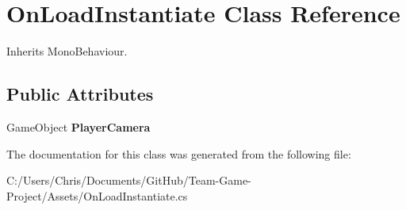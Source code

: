\hypertarget{class_on_load_instantiate}{}\section{On\+Load\+Instantiate Class Reference}
\label{class_on_load_instantiate}


Inherits Mono\+Behaviour.

\subsection*{Public Attributes}
\begin{DoxyCompactItemize}
\item 
Game\+Object {\bfseries Player\+Camera}\hypertarget{class_on_load_instantiate_a0cf26d9c7f51e1ba562f220687f93acd}{}\label{class_on_load_instantiate_a0cf26d9c7f51e1ba562f220687f93acd}

\end{DoxyCompactItemize}


The documentation for this class was generated from the following file\+:\begin{DoxyCompactItemize}
\item 
C\+:/\+Users/\+Chris/\+Documents/\+Git\+Hub/\+Team-\/\+Game-\/\+Project/\+Assets/On\+Load\+Instantiate.\+cs\end{DoxyCompactItemize}
